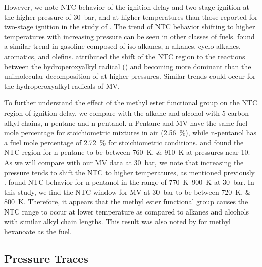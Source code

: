 \documentclass[letterpaper, review, sort&compress]{elsarticle}
\begin{document}
However, we note NTC behavior of the ignition delay and two-stage ignition at the higher pressure of
\SI{30}{\bar}, and at higher temperatures than those reported for two-stage ignition in the study of
\citet{Hadj-Ali2009}. The trend of NTC behavior shifting to higher temperatures with increasing
pressure can be seen in other classes of fuels. \citet{Kukkadapu2012} found a similar trend in
gasoline composed of iso-alkanes, n-alkanes, cyclo-alkanes, aromatics, and olefins.
\citet{Kukkadapu2012} attributed the shift of the NTC region to the reactions between the
hydroperoxyalkyl radical () and  becoming more dominant than the unimolecular
decomposition of  at higher pressures. Similar trends could occur for the hydroperoxyalkyl
radicals of MV.

To further understand the effect of the methyl ester functional group on the NTC region of ignition
delay, we compare with the alkane and alcohol with 5-carbon alkyl chains, n-pentane and n-pentanol.
n-Pentane and MV have the same fuel mole percentage for stoichiometric mixtures in air
(\SI{2.56}{\percent}), while n-pentanol has a fuel mole percentage of \SI{2.72}{\percent} for
stoichiometric conditions. \citet{Ribaucour1998} and \citet{Bugler2015} found the NTC region for
n-pentane to be between \SIlist{760;910}{\K} at pressures near \SI{10}{\atm}. As we will compare
with our MV data at \SI{30}{\bar}, we note that increasing the pressure tends to shift the NTC to
higher temperatures, as mentioned previously \cite{Kukkadapu2012}. \citet{Heufer2013} found NTC
behavior for n-pentanol in the range of \SIrange{770}{900}{\K} at \SI{30}{\bar}. In this study, we
find the NTC window for MV at \SI{30}{\bar} to be between \SIlist{720;800}{\K}. Therefore, it
appears that the methyl ester functional group causes the NTC range to occur at lower temperature as
compared to alkanes and alcohols with similar alkyl chain lengths. This result was also noted by
\citet{Hadj-Ali2009} for methyl hexanoate as the fuel.

\subsection{Pressure Traces}\label{sec:pressure-traces}
\end{document}
